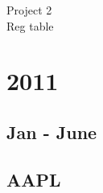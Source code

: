 \documentclass{article}[14pt]
\begin{document}
\bigskip

\begin{center}
  \begin{Large}
    Project 2\\
    Reg table
  \end{Large}
\end{center} 
\section{ 2011}

\subsection{Jan - June}
\subsection{AAPL}
\end{document}
